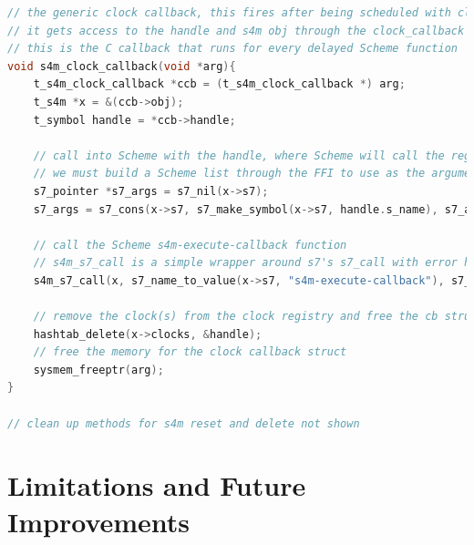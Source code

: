 \documentclass[acmsmall]{acmart}
\begin{document}
\begin{lstlisting}[language=C]
// the generic clock callback, this fires after being scheduled with clock_fdelay 
// it gets access to the handle and s4m obj through the clock_callback struct
// this is the C callback that runs for every delayed Scheme function 
void s4m_clock_callback(void *arg){
    t_s4m_clock_callback *ccb = (t_s4m_clock_callback *) arg;
    t_s4m *x = &(ccb->obj);
    t_symbol handle = *ccb->handle; 
  
    // call into Scheme with the handle, where Scheme will call the registered delayed function
    // we must build a Scheme list through the FFI to use as the arguments
    s7_pointer *s7_args = s7_nil(x->s7);
    s7_args = s7_cons(x->s7, s7_make_symbol(x->s7, handle.s_name), s7_args); 

    // call the Scheme s4m-execute-callback function
    // s4m_s7_call is a simple wrapper around s7's s7_call with error handling and logging 
    s4m_s7_call(x, s7_name_to_value(x->s7, "s4m-execute-callback"), s7_args);   

    // remove the clock(s) from the clock registry and free the cb struct
    hashtab_delete(x->clocks, &handle);
    // free the memory for the clock callback struct 
    sysmem_freeptr(arg);
}

// clean up methods for s4m reset and delete not shown

\end{lstlisting}

\section{Limitations and Future Improvements}
\end{document}
